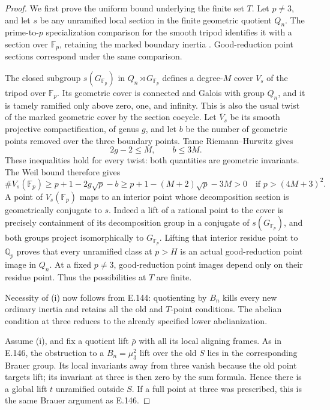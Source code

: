 \begin{proof}
We first prove the uniform bound underlying
the finite set \(T\).
Let \(p\ne3\), and let \(s\) be any unramified
local section in the finite geometric quotient
\(Q_n\). The prime-to-\(p\) specialization
comparison for the smooth tripod identifies
it with a section over \(\mathbb F_p\), retaining
the marked boundary inertia
\citep[XIII, Corollary 2.9, \S2.10,
Lemma 2.11, pp.288--290]{RootSGA1}.
Good-reduction point sections correspond
under the same comparison.

The closed subgroup \(s(G_{\mathbb F_p})\)
in \(Q_n\rtimes G_{\mathbb F_p}\) defines
a degree-\(M\) cover \(V_s\) of the tripod
over \(\mathbb F_p\).
Its geometric cover is connected and Galois
with group \(Q_n\), and it is tamely ramified
only above zero, one, and infinity.
This is also the usual twist of the marked
geometric cover by the section cocycle.
Let \(\overline V_s\) be its smooth projective
compactification, of genus \(g\), and let
\(b\) be the number of geometric points
removed over the three boundary points.
Tame Riemann--Hurwitz gives
\[
          2g-2\le M,\qquad b\le3M.
 \tag{E.147.3}
\]
These inequalities hold for every twist:
both quantities are geometric invariants.
The Weil bound
\citep[(1.5.1)--(1.6), pp.275--276]{RootDeligne1974}
therefore gives
\[
 \#V_s(\mathbb F_p)
       \ge p+1-2g\sqrt p-b
       \ge p+1-(M+2)\sqrt p-3M>0
                 \quad\text{if }p>(4M+3)^2.
 \tag{E.147.4}
\]
A point of \(V_s(\mathbb F_p)\) maps to an
interior point whose decomposition section
is geometrically conjugate to \(s\).
Indeed a lift of a rational point to the
cover is precisely containment of its
decomposition group in a conjugate of
\(s(G_{\mathbb F_p})\), and both groups
project isomorphically to \(G_{\mathbb F_p}\).
Lifting that interior residue point to
\(\mathbb Q_p\) proves that every unramified
class at \(p>H\) is an actual good-reduction
point image in \(Q_n\).
At a fixed \(p\ne3\), good-reduction point
images depend only on their residue point.
Thus the possibilities at \(T\) are finite.

Necessity of (i) now follows from E.144:
quotienting by \(B_n\) kills every new
ordinary inertia and retains all the old
and \(T\)-point conditions. The abelian
condition at three reduces to the already
specified lower abelianization.

Assume (i), and fix a quotient lift
\(\bar\rho\) with all its local aligning
frames. As in E.146, the obstruction to
a \(B_n=\mu_3^2\) lift over the old \(S\)
lies in the corresponding Brauer group.
Its local invariants away from three
vanish because the old point targets lift;
its invariant at three is then zero by
the sum formula. Hence there is a global
lift \(t\) unramified outside \(S\).
If a full point at three was prescribed,
this is the same Brauer argument as E.146.


\end{proof}
